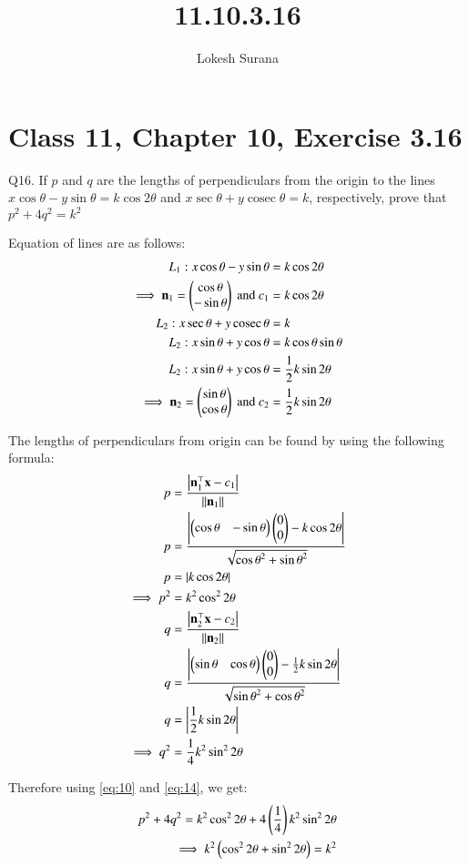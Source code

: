\documentclass[journal,12pt,twocolumn]{IEEEtran}
\renewcommand{\vec}[1]{\boldsymbol{\mathbf{#1}}}
\begin{document}
\newcommand{\cosec}{\mathop{\mathrm{cosec}}}

\vspace{3cm}
\title{11.10.3.16}
\author{Lokesh Surana}
\maketitle
\section*{Class 11, Chapter 10, Exercise 3.16}

Q16. If ${p}$ and ${q}$ are the lengths of perpendiculars from the origin to the lines ${x}\cos\theta - {y}\sin\theta =  {k}\cos2\theta$ and ${x}\sec\theta + {y}\cosec\theta = {k}$, respectively, prove that ${p}^2 + 4{q}^2 = {k}^2$

\solution Equation of lines are as follows:
\begin{align}
    \label{eq:1} {L}_1: {x}\cos\theta - {y}\sin\theta &=  {k}\cos2\theta \\
    \label{eq:2} \implies \vec{n}_1 = \myvec{\cos\theta \\ -\sin\theta} \text{ and } {c}_1 &= {k}\cos2\theta\\
    \label{eq:3} {L}_2: {x}\sec\theta + {y}\cosec\theta &= {k} \\
    \label{eq:4} {L}_2: {x}\sin\theta + {y}\cos\theta &= {k}\cos\theta\sin\theta \\
    \label{eq:5} {L}_2: {x}\sin\theta + {y}\cos\theta &= \frac{1}{2}{k}\sin2\theta \\
    \label{eq:6} \implies \vec{n}_2 = \myvec{\sin\theta \\ \cos\theta} \text{ and } {c}_2 &= \frac{1}{2}{k}\sin2\theta
\end{align}

The lengths of perpendiculars from origin can be found by using the following formula:
\begin{align}
    \label{eq:7} {p} &= \frac{\abs{  \vec{n}_1^{\top}\vec{x}-{c}_1 }}{\norm{\vec{n}_1}} \\
    \label{eq:8} {p} &= \frac{\abs{ \myvec{\cos\theta & -\sin\theta}\myvec{0\\0} - {k}\cos2\theta}}{\sqrt{{\cos\theta}^2 + {\sin\theta}^2}} \\
    \label{eq:9} {p} &= \abs{{k}\cos2\theta} \\
    \label{eq:10} \implies {p}^2 &= {k}^2\cos^2 2\theta\\
    \label{eq:11} {q} &= \frac{\abs{  \vec{n}_2^{\top}\vec{x}-{c}_2 }}{\norm{\vec{n}_2}} \\
    \label{eq:12} {q} &= \frac{\abs{ \myvec{\sin\theta & \cos\theta}\myvec{0\\0} - \frac{1}{2}{k}\sin2\theta}}{\sqrt{{\sin\theta}^2 + {\cos\theta}^2}} \\
    \label{eq:13} {q} &= \abs{ \frac{1}{2}{k}\sin2\theta}\\
    \label{eq:14} \implies {q}^2 &= \frac{1}{4}{k}^2\sin^2 2\theta
\end{align}

Therefore using \eqref{eq:10} and \eqref{eq:14}, we get:
\begin{align}
    {p}^2 + 4{q}^2 = {k}^2\cos^2 2\theta + 4 \left(\frac{1}{4}\right){k}^2\sin^2 2\theta \\
    \implies {k}^2\left(\cos^2 2\theta + \sin^2 2\theta\right) = {k}^2
\end{align}
\end{document}
